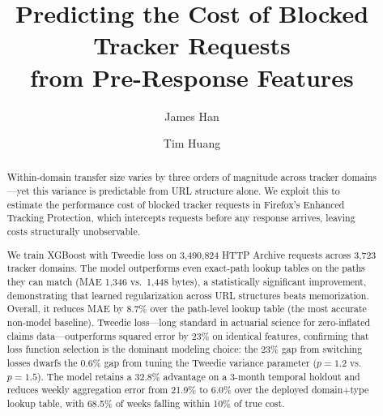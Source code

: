 \documentclass[sigconf,nonacm]{acmart}
\newcommand{\numrequests}{3{,}490{,}824\xspace}
\newcommand{\numdomains}{3{,}723\xspace}
\begin{document}
\title{Predicting the Cost of Blocked Tracker Requests\\from Pre-Response Features}

\author{James Han}

\author{Tim Huang}


\begin{abstract}

Within-domain transfer size varies by three orders of magnitude across tracker domains---yet this variance is predictable from URL structure alone.
We exploit this to estimate the performance cost of blocked tracker requests in Firefox's Enhanced Tracking Protection, which intercepts requests before any response arrives, leaving costs structurally unobservable.

We train XGBoost with Tweedie loss on \numrequests HTTP Archive requests across \numdomains tracker domains.
The model outperforms even exact-path lookup tables on the paths they can match (MAE 1{,}346 vs.\ 1{,}448 bytes), a statistically significant improvement, demonstrating that learned regularization across URL structures beats memorization.
Overall, it reduces MAE by 8.7\% over the path-level lookup table (the most accurate non-model baseline).
Tweedie loss---long standard in actuarial science for zero-inflated claims data---outperforms squared error by 23\% on identical features, confirming that loss function selection is the dominant modeling choice: the 23\% gap from switching losses dwarfs the 0.6\% gap from tuning the Tweedie variance parameter ($p=1.2$ vs.\ $p=1.5$).
The model retains a 32.8\% advantage on a 3-month temporal holdout and reduces weekly aggregation error from 21.9\% to 6.0\% over the deployed domain+type lookup table, with 68.5\% of weeks falling within 10\% of true cost.

\end{abstract}

\end{document}
